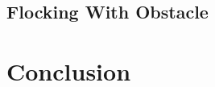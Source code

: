 \documentclass[journal]{IEEEtran}
\begin{document}
					      \subsection{Flocking With Obstacle}
					      \section{Conclusion}




\end{document}
